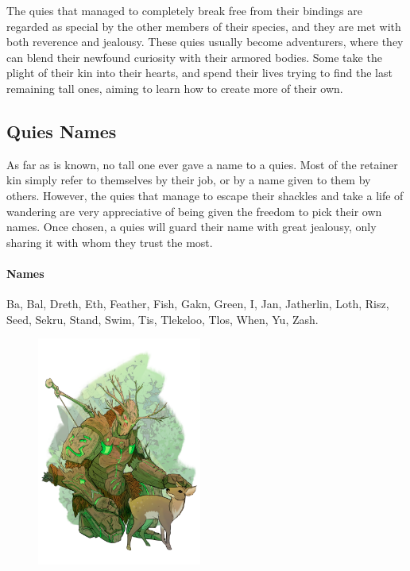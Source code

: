 \begin{linenumbers}
The quies that managed to completely break free from their bindings are regarded as special by the other members of their species, and they are met with both reverence and jealousy.
These quies usually become adventurers, where they can blend their newfound curiosity with their armored bodies.
Some take the plight of their kin into their hearts, and spend their lives trying to find the last remaining tall ones, aiming to learn how to create more of their own.

\subsection*{Quies Names}
As far as is known, no tall one ever gave a name to a quies.
Most of the retainer kin simply refer to themselves by their job, or by a name given to them by others.
However, the quies that manage to escape their shackles and take a life of wandering are very appreciative of being given the freedom to pick their own names.
Once chosen, a quies will guard their name with great jealousy, only sharing it with whom they trust the most.

\paragraph{Names} Ba, Bal, Dreth, Eth, Feather, Fish, Gakn, Green, I, Jan, Jatherlin, Loth, Risz, Seed, Sekru, Stand, Swim, Tis, Tlekeloo, Tlos, When, Yu, Zash.

\begin{figure}[!t]
    \centering
    \includegraphics[width=0.48\textwidth]{02kins/img/21quies_druid.png}
\end{figure}


\end{linenumbers}
